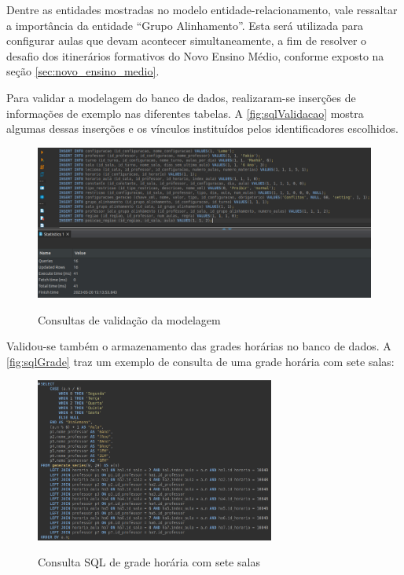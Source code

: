 Dentre as entidades mostradas no modelo entidade-relacionamento, vale ressaltar a importância da entidade ``Grupo Alinhamento''. Esta será utilizada para configurar aulas que devam acontecer simultaneamente, a fim de resolver o desafio dos itinerários formativos do Novo Ensino Médio, conforme exposto na seção \ref{sec:novo_ensino_medio}.

Para validar a modelagem do banco de dados, realizaram-se inserções de informações de exemplo nas diferentes tabelas. A \autoref{fig:sqlValidacao} mostra algumas dessas inserções e os vínculos instituídos pelos identificadores escolhidos.

\begin{figure}[!htb]
	\centering
	\caption{Consultas de validação da modelagem}
	\includegraphics[width=1\textwidth]{./dados/figuras/sql_validacao}
	\label{fig:sqlValidacao}
\end{figure}
\newpage

Validou-se também o armazenamento das grades horárias no banco de dados. A \autoref{fig:sqlGrade} traz um exemplo de consulta de uma grade horária com sete salas:

\begin{figure}[!htb]
	\centering
	\caption{Consulta SQL de grade horária com sete salas}
	\includegraphics[width=0.7\textwidth]{./dados/figuras/sql_grade}
	\label{fig:sqlGrade}
\end{figure}

